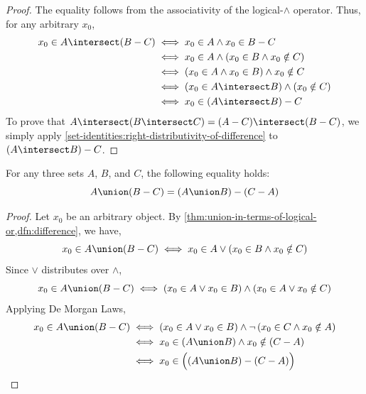 \begin{proof}
    The equality follows from the associativity of the logical-\( \land \) operator.
    Thus, for any arbitrary \( x_{0} \),
    \begin{align*}
        x_{0} \in A \intersect \mleft( B - C \mright)
        &\iff
        x_{0} \in A \land x_{0} \in B - C\\
        &\iff
        x_{0} \in A \land \mleft( x_{0} \in B \land x_{0} \notin C \mright)\\
        &\iff
        \mleft( x_{0} \in A \land x_{0} \in B \mright) \land x_{0} \notin C\\
        &\iff
        \mleft( x_{0} \in A \intersect B \mright) \land \mleft( x_{0} \notin C \mright)\\
        &\iff
        x_{0} \in \mleft( A \intersect B \mright) - C
    \end{align*}
    To prove that \( A \intersect \mleft( B \intersect C \mright) = \mleft( A - C \mright) \intersect \mleft( B - C \mright) \),
    we simply apply \cref{set-identities:right-distributivity-of-difference} to
    \( \mleft( A \intersect B \mright) - C \).
\end{proof}

\begin{thm}
    \label{set-identities:union-difference}
    For any three sets \( A \), \( B \), and \( C \), the following equality holds:
    \begin{equation*}
        A \union \mleft( B - C \mright) = \mleft( A \union B \mright) - \mleft( C - A \mright)
    \end{equation*}
\end{thm}

\begin{proof}
    Let \( x_{0} \) be an arbitrary object. By \cref{thm:union-in-terms-of-logical-or,dfn:difference}, we have,
    \begin{equation*}
        x_{0} \in A \union \mleft( B - C \mright)
        \iff
        x_{0} \in A \lor \mleft( x_{0} \in B \land x_{0} \notin C \mright)
    \end{equation*}
    Since \( \lor \) distributes over \( \land \),
    \begin{equation*}
        x_{0} \in A \union \mleft( B - C \mright)
        \iff
        \mleft( x_{0} \in A \lor x_{0} \in B \mright)
        \land
        \mleft( x_{0} \in A \lor x_{0} \notin C \mright)
    \end{equation*}
    Applying De Morgan Laws,
    \begin{align*}
        x_{0} \in A \union \mleft( B - C \mright)
        &\iff
        \mleft( x_{0} \in A \lor x_{0} \in B \mright)
        \land \lnot \,
        \mleft( x_{0} \in C \land x_{0} \notin A \mright)\\
        &\iff
        x_{0} \in \mleft( A \union B \mright)
        \land
        x_{0} \notin \mleft( C - A \mright)\\
        &\iff
        x_{0} \in \Big( \mleft( A \union B \mright) - \mleft( C - A \mright) \Big) \qedhere
    \end{align*}
\end{proof}

